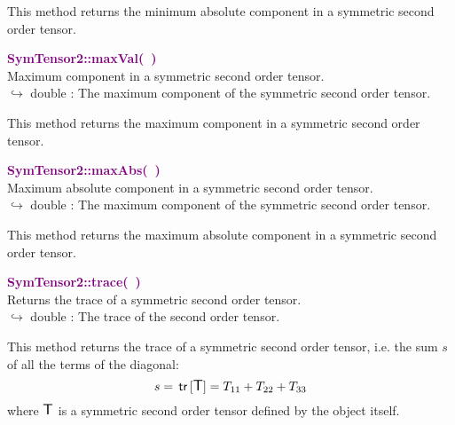 This method returns the minimum absolute component in a symmetric second order tensor.

\textcolor{purple}{\textbf{SymTensor2::maxVal(~)}}\label{SymTensor2::maxVal()}\\
Maximum component in a symmetric second order tensor.\\ \hspace*{10mm}$\hookrightarrow$ double : The maximum component of the symmetric second order tensor.

This method returns the maximum component in a symmetric second order tensor.

\textcolor{purple}{\textbf{SymTensor2::maxAbs(~)}}\label{SymTensor2::maxAbs()}\\
Maximum absolute component in a symmetric second order tensor.\\ \hspace*{10mm}$\hookrightarrow$ double : The maximum component of the symmetric second order tensor.

This method returns the maximum absolute component in a symmetric second order tensor.

\textcolor{purple}{\textbf{SymTensor2::trace(~)}}\label{SymTensor2::trace()}\\
Returns the trace of a symmetric second order tensor.\\ \hspace*{10mm}$\hookrightarrow$ double : The trace of the second order tensor.

This method returns the trace of a symmetric second order tensor, i.e. the sum $s$ of all the terms of the diagonal:
\begin{equation*}
s = \mbox{\ensuremath{\mathsf{\,tr\,}}}[\mbox{\large\ensuremath{\mathsf{T}}}] = T_{11}+T_{22}+T_{33}
\end{equation*}
where $\mbox{\large\ensuremath{\mathsf{T}}}$ is a symmetric second order tensor defined by the object itself.

